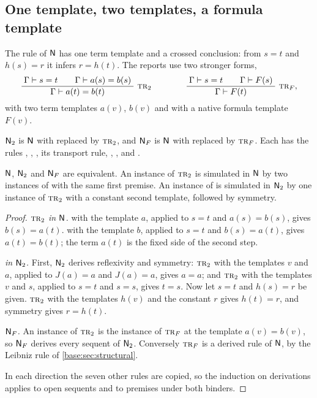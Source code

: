 \subsection{One template, two templates, a formula template}
\label{kern:sec:templates}

The rule  of $\mathsf{N}$ has one term template and a crossed
conclusion: from $s=t$ and $h(s)=r$ it infers $r=h(t)$.  The reports use two
stronger forms,
\[
 \infrule{\Gamma\proves s=t\qquad\Gamma\proves a(s)=b(s)}
         {\Gamma\proves a(t)=b(t)}\ \rulename{Tr}_{2}
 \qquad\qquad
 \infrule{\Gamma\proves s=t\qquad\Gamma\proves F(s)}
         {\Gamma\proves F(t)}\ \rulename{Tr}_{F},
\]
with two term templates $a(v)$, $b(v)$ and with a native formula template
$F(v)$.

\begin{definition}
\label{kern:def:N2}
$\mathsf{N}_{2}$ is $\mathsf{N}$ with  replaced by $\rulename{Tr}_{2}$, and
$\mathsf{N}_{F}$ is $\mathsf{N}$ with  replaced by $\rulename{Tr}_{F}$.  Each
has the rules , , , its transport
rule, , ,  and .
\end{definition}

\begin{theorem}
\label{kern:thm:onecontext}
$\mathsf{N}$, $\mathsf{N}_{2}$ and $\mathsf{N}_{F}$ are equivalent.  An instance of
$\rulename{Tr}_{2}$ is simulated in $\mathsf{N}$ by two instances of 
with the same first premise.  An instance of  is simulated in
$\mathsf{N}_{2}$ by one instance of $\rulename{Tr}_{2}$ with a constant second
template, followed by symmetry.
\end{theorem}

\begin{proof}
\emph{$\rulename{Tr}_{2}$ in $\mathsf{N}$.}   with the template $a$,
applied to $s=t$ and $a(s)=b(s)$, gives $b(s)=a(t)$.   with the
template $b$, applied to $s=t$ and $b(s)=a(t)$, gives $a(t)=b(t)$; the term
$a(t)$ is the fixed side of the second step.

\emph{ in $\mathsf{N}_{2}$.}  First, $\mathsf{N}_{2}$ derives reflexivity and
symmetry: $\rulename{Tr}_{2}$ with the templates $v$ and $a$, applied to
$J(a)=a$ and $J(a)=a$, gives $a=a$; and $\rulename{Tr}_{2}$ with the
templates $v$ and $s$, applied to $s=t$ and $s=s$, gives $t=s$.  Now let
$s=t$ and $h(s)=r$ be given.  $\rulename{Tr}_{2}$ with the templates $h(v)$
and the constant $r$ gives $h(t)=r$, and symmetry gives $r=h(t)$.

\emph{$\mathsf{N}_{F}$.}  An instance of $\rulename{Tr}_{2}$ is the instance of
$\rulename{Tr}_{F}$ at the template $a(v)=b(v)$, so $\mathsf{N}_{F}$ derives every
sequent of $\mathsf{N}_{2}$.  Conversely $\rulename{Tr}_{F}$ is a derived rule of
$\mathsf{N}$, by the Leibniz rule of \cref{base:sec:structural}.

In each direction the seven other rules are copied, so the induction on
derivations applies to open sequents and to premises under both binders.
\end{proof}

